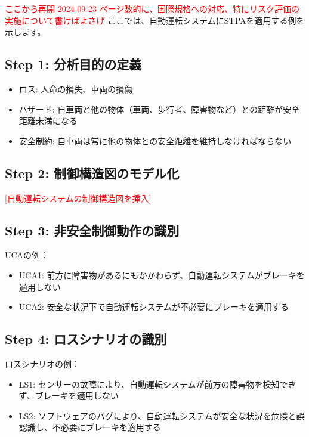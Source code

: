 \textcolor{red}{ここから再開 2024-09-23}
\textcolor{red}{ページ数的に、国際規格への対応、特にリスク評価の実施について書けばよさげ}
ここでは、自動運転システムにSTPAを適用する例を示します。

\subsection{Step 1: 分析目的の定義}

\begin{itemize}
    \item ロス: 人命の損失、車両の損傷
    \item ハザード: 自車両と他の物体（車両、歩行者、障害物など）との距離が安全距離未満になる
    \item 安全制約: 自車両は常に他の物体との安全距離を維持しなければならない
\end{itemize}

\subsection{Step 2: 制御構造図のモデル化}

\textcolor{red}{[自動運転システムの制御構造図を挿入]}

\subsection{Step 3: 非安全制御動作の識別}

UCAの例：
\begin{itemize}
    \item UCA1: 前方に障害物があるにもかかわらず、自動運転システムがブレーキを適用しない
    \item UCA2: 安全な状況下で自動運転システムが不必要にブレーキを適用する
\end{itemize}

\subsection{Step 4: ロスシナリオの識別}

ロスシナリオの例：
\begin{itemize}
    \item LS1: センサーの故障により、自動運転システムが前方の障害物を検知できず、ブレーキを適用しない
    \item LS2: ソフトウェアのバグにより、自動運転システムが安全な状況を危険と誤認識し、不必要にブレーキを適用する
\end{itemize}

